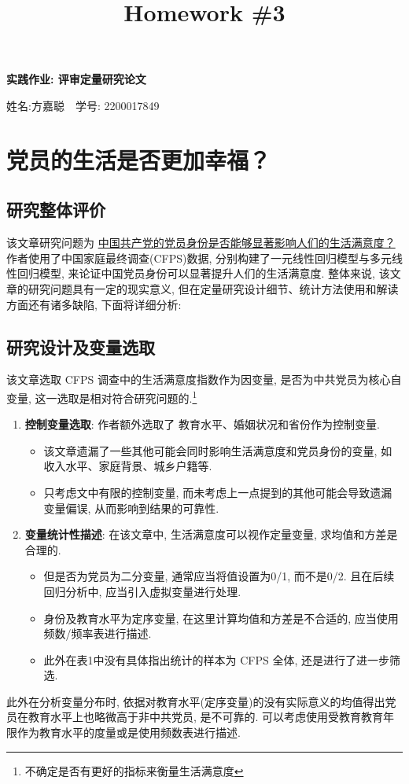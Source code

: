 \documentclass[11pt]{article}
\title{Homework \#3}
\newcommand\1{\mathds{1}}
\begin{document}
\pagestyle{fancy}
\chead{}
\fancyfoot[C]{\thepage\ /\ \pageref{LastPage} \\ \textcolor{lightgray}{最后编译时间: \today}}



\begin{center}
    {\LARGE \bf 实践作业: 评审定量研究论文}

    {姓名:方嘉聪\ \  学号: 2200017849}            %
\end{center}

\section{党员的生活是否更加幸福？}

\subsection{研究整体评价}
    该文章研究问题为 \underline{中国共产党的党员身份是否能够显著影响人们的生活满意度？} 作者使用了中国家庭最终调查(CFPS)数据, 
    分别构建了一元线性回归模型与多元线性回归模型, 来论证中国党员身份可以显著提升人们的生活满意度. 整体来说, 该文章的研究问题具有一定的现实意义,
    但在定量研究设计细节、统计方法使用和解读方面还有诸多缺陷, 下面将详细分析:
\subsection{研究设计及变量选取}
    该文章选取 CFPS 调查中的生活满意度指数作为因变量, 是否为中共党员为核心自变量, 这一选取是相对符合研究问题的.\footnote{不确定是否有更好的指标来衡量生活满意度}
    \begin{enumerate}[label=(\arabic*)]
        \item \textbf{控制变量选取}: 作者额外选取了 教育水平、婚姻状况和省份作为控制变量. 
        \begin{itemize}
            \item 该文章遗漏了一些其他可能会同时影响生活满意度和党员身份的变量, 如收入水平、家庭背景、城乡户籍等.
            \item 只考虑文中有限的控制变量, 而未考虑上一点提到的其他可能会导致遗漏变量偏误, 从而影响到结果的可靠性.
        \end{itemize}
        \item \textbf{变量统计性描述}: 在该文章中, 生活满意度可以视作定量变量, 求均值和方差是合理的.
        \begin{itemize}
            \item 但是否为党员为二分变量, 通常应当将值设置为0/1, 而不是0/2. 且在后续回归分析中, 应当引入虚拟变量进行处理.
            \item 身份及教育水平为定序变量, 在这里计算均值和方差是不合适的, 应当使用频数/频率表进行描述.
            \item 此外在表1中没有具体指出统计的样本为 CFPS 全体, 还是进行了进一步筛选.
        \end{itemize}
    \end{enumerate}
    此外在分析变量分布时, 依据对教育水平(定序变量)的没有实际意义的均值得出党员在教育水平上也略微高于非中共党员, 是不可靠的. 可以考虑使用受教育教育年限作为教育水平的度量或是使用频数表进行描述.
\end{document}
